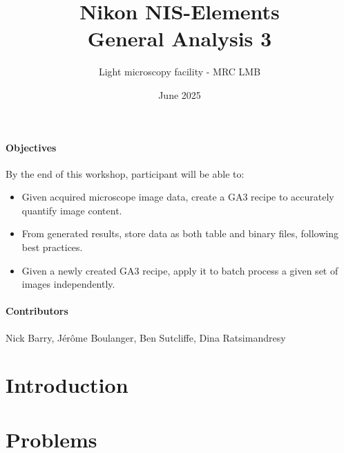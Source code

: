 \documentclass[a4paper,DIV=17,dvipsnames,headsepline,11pt]{scrartcl}
\title{Nikon NIS-Elements\\ General Analysis 3}
\author{Light microscopy facility - MRC LMB}
\date{June 2025}
\begin{document}
\maketitle

\paragraph{Objectives}
By the end of this workshop, participant will be able to:
\begin{itemize}
\item Given acquired microscope image data, create a GA3 recipe to accurately quantify image content.
\item From generated results, store data as both table and binary files, following best practices.
\item Given a newly created GA3 recipe, apply it to batch process a given set of images independently.
\end{itemize}

\paragraph{Contributors}
Nick Barry, Jérôme Boulanger, Ben Sutcliffe, Dina Ratsimandresy

\tableofcontents \newpage
\section{Introduction}
  \newpage

\section{Problems}
 \newpage
 \newpage
 \newpage
 \newpage
 \newpage
 \newpage
 \newpage
 \newpage

\appendix
\printendnotes
\end{document}
